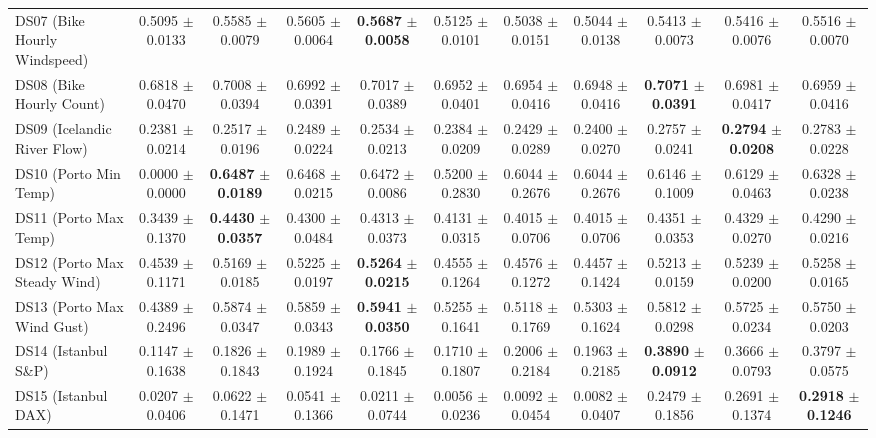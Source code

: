 \begin{table}[t]
{{\begin{tabular}{lcccccccccc}
DS07 (Bike Hourly Windspeed) & 0.5095 $\pm$ 0.0133 & 0.5585 $\pm$ 0.0079 & 0.5605 $\pm$ 0.0064 & \textbf{0.5687} $\pm$ \textbf{0.0058} & 0.5125 $\pm$ 0.0101 & 0.5038 $\pm$ 0.0151 & 0.5044 $\pm$ 0.0138 & 0.5413 $\pm$ 0.0073 & 0.5416 $\pm$ 0.0076 & 0.5516 $\pm$ 0.0070 \\
DS08 (Bike Hourly Count) & 0.6818 $\pm$ 0.0470 & 0.7008 $\pm$ 0.0394 & 0.6992 $\pm$ 0.0391 & 0.7017 $\pm$ 0.0389 & 0.6952 $\pm$ 0.0401 & 0.6954 $\pm$ 0.0416 & 0.6948 $\pm$ 0.0416 & \textbf{0.7071} $\pm$ \textbf{0.0391} & 0.6981 $\pm$ 0.0417 & 0.6959 $\pm$ 0.0416 \\
DS09 (Icelandic River Flow) & 0.2381 $\pm$ 0.0214 & 0.2517 $\pm$ 0.0196 & 0.2489 $\pm$ 0.0224 & 0.2534 $\pm$ 0.0213 & 0.2384 $\pm$ 0.0209 & 0.2429 $\pm$ 0.0289 & 0.2400 $\pm$ 0.0270 & 0.2757 $\pm$ 0.0241 & \textbf{0.2794} $\pm$ \textbf{0.0208} & 0.2783 $\pm$ 0.0228 \\
DS10 (Porto Min Temp) & 0.0000 $\pm$ 0.0000 & \textbf{0.6487} $\pm$ \textbf{0.0189} & 0.6468 $\pm$ 0.0215 & 0.6472 $\pm$ 0.0086 & 0.5200 $\pm$ 0.2830 & 0.6044 $\pm$ 0.2676 & 0.6044 $\pm$ 0.2676 & 0.6146 $\pm$ 0.1009 & 0.6129 $\pm$ 0.0463 & 0.6328 $\pm$ 0.0238 \\
DS11 (Porto Max Temp) & 0.3439 $\pm$ 0.1370 & \textbf{0.4430} $\pm$ \textbf{0.0357} & 0.4300 $\pm$ 0.0484 & 0.4313 $\pm$ 0.0373 & 0.4131 $\pm$ 0.0315 & 0.4015 $\pm$ 0.0706 & 0.4015 $\pm$ 0.0706 & 0.4351 $\pm$ 0.0353 & 0.4329 $\pm$ 0.0270 & 0.4290 $\pm$ 0.0216 \\
DS12 (Porto Max Steady Wind) & 0.4539 $\pm$ 0.1171 & 0.5169 $\pm$ 0.0185 & 0.5225 $\pm$ 0.0197 & \textbf{0.5264} $\pm$ \textbf{0.0215} & 0.4555 $\pm$ 0.1264 & 0.4576 $\pm$ 0.1272 & 0.4457 $\pm$ 0.1424 & 0.5213 $\pm$ 0.0159 & 0.5239 $\pm$ 0.0200 & 0.5258 $\pm$ 0.0165 \\
DS13 (Porto Max Wind Gust) & 0.4389 $\pm$ 0.2496 & 0.5874 $\pm$ 0.0347 & 0.5859 $\pm$ 0.0343 & \textbf{0.5941} $\pm$ \textbf{0.0350} & 0.5255 $\pm$ 0.1641 & 0.5118 $\pm$ 0.1769 & 0.5303 $\pm$ 0.1624 & 0.5812 $\pm$ 0.0298 & 0.5725 $\pm$ 0.0234 & 0.5750 $\pm$ 0.0203 \\
DS14 (Istanbul S\&P) & 0.1147 $\pm$ 0.1638 & 0.1826 $\pm$ 0.1843 & 0.1989 $\pm$ 0.1924 & 0.1766 $\pm$ 0.1845 & 0.1710 $\pm$ 0.1807 & 0.2006 $\pm$ 0.2184 & 0.1963 $\pm$ 0.2185 & \textbf{0.3890} $\pm$ \textbf{0.0912} & 0.3666 $\pm$ 0.0793 & 0.3797 $\pm$ 0.0575 \\
DS15 (Istanbul DAX) & 0.0207 $\pm$ 0.0406 & 0.0622 $\pm$ 0.1471 & 0.0541 $\pm$ 0.1366 & 0.0211 $\pm$ 0.0744 & 0.0056 $\pm$ 0.0236 & 0.0092 $\pm$ 0.0454 & 0.0082 $\pm$ 0.0407 & 0.2479 $\pm$ 0.1856 & 0.2691 $\pm$ 0.1374 & \textbf{0.2918} $\pm$ \textbf{0.1246} \\

\end{tabular}}}
\end{table}
